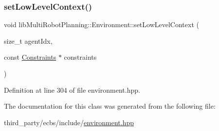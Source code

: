 \subsubsection{\texorpdfstring{set\+Low\+Level\+Context()}{setLowLevelContext()}}
{\footnotesize\ttfamily void lib\+Multi\+Robot\+Planning\+::\+Environment\+::set\+Low\+Level\+Context (\begin{DoxyParamCaption}\item[{size\+\_\+t}]{agent\+Idx,  }\item[{const \hyperlink{structlib_multi_robot_planning_1_1_constraints}{Constraints} $\ast$}]{constraints }\end{DoxyParamCaption})\hspace{0.3cm}{\ttfamily [inline]}}



Definition at line 304 of file environment.\+hpp.



The documentation for this class was generated from the following file\+:\begin{DoxyCompactItemize}
\item 
third\+\_\+party/ecbs/include/\hyperlink{environment_8hpp}{environment.\+hpp}\end{DoxyCompactItemize}
